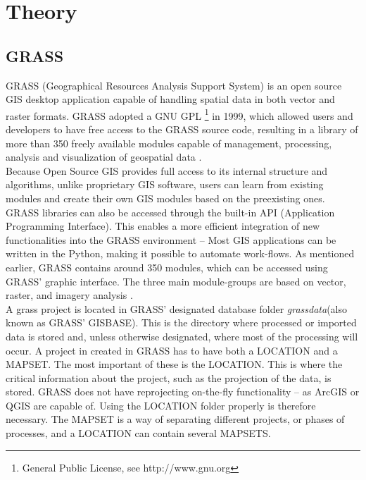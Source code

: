 
\chapter{Theory} %

\label{ch:theory} %


\section{GRASS}

GRASS (Geographical Resources Analysis Support System) is an open source GIS desktop application capable of handling spatial data in both vector and raster formats. 
GRASS adopted a GNU GPL \footnote{General Public License, see http://www.gnu.org} in 1999, which allowed users and developers to have free access to the GRASS source code, resulting in a library of more than 350 freely available modules capable of management, processing, analysis and visualization of geospatial data \citep{GRASSGIS}.\\
Because Open Source GIS provides full access to its internal structure and algorithms, unlike proprietary GIS software, users can learn from existing modules and create their own GIS modules based on the preexisting ones. GRASS libraries can also be accessed through the built-in API (Application Programming Interface). This enables a more efficient integration of new functionalities into the GRASS environment – Most GIS applications can be written in the Python, making it possible to automate work-flows.
As mentioned earlier, GRASS contains around 350 modules, which can be accessed using GRASS' graphic interface. The three main module-groups are based on vector, raster, and imagery analysis \citep{grassbook}.\\

A grass project is located in GRASS' designated database folder \textit{grassdata}(also known as GRASS' GISBASE). This is the directory where processed or imported data is stored and, unless otherwise designated, where most of the processing will occur. 
A project in created in GRASS has to have both a \textsc{LOCATION} and a \textsc{MAPSET}.
The most important of these is the \textsc{LOCATION}. This is where the critical information about the project, such as the projection of the data, is stored. 
GRASS does not have reprojecting on-the-fly functionality – as ArcGIS or QGIS are capable of. Using the \textsc{LOCATION} folder properly is therefore necessary. 
The \textsc{MAPSET} is a way of separating different projects, or phases of processes, and a LOCATION can contain several \textsc{MAPSETS}\citep{grassbook}. 

